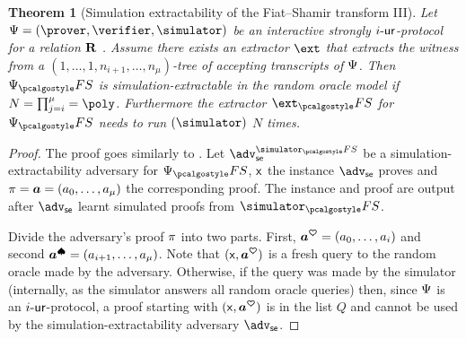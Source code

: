 \documentclass[runningheads]{llncs}
\let\spvec\vec
\let\vec\accentvec
\let\vec\spvec
\def\vec#1{\mathchoice{\mbox{\boldmath$\displaystyle#1$}}
	{\mbox{\boldmath$\textstyle#1$}}
	{\mbox{\boldmath$\scriptstyle#1$}}
	{\mbox{\boldmath$\scriptscriptstyle#1$}}}
\newtheorem{theorem}{Theorem}%
\theoremstyle{definition}
\begin{document}
\begin{theorem}[Simulation extractability of the Fiat--Shamir transform III]
	\label{thm:wit_ext_em_FS_III}
	Let $\proofsystem = (\prover, \verifier, \simulator)$ be an interactive strongly ${i\text{-}\mathsf{ur}}$-protocol for a relation $\mathbf{R}$ . 
	Assume there exists an extractor $\ext$ that extracts the witness from a $(1, \ldots, 1, n_{i + 1}, \ldots, n_\mu)$-tree of accepting transcripts of $\mathrm{\Psi}$. 
	Then $\proofsystem_\fs$ is simulation-extractable in the random oracle model if $N =\prod_{j = i}^\mu = \poly$.
	Furthermore the extractor $\ext_\fs$ for $\proofsystem_\fs$ needs to run $(\simulator)$ $N$ times.
\end{theorem}
\begin{proof}
	The proof goes similarly to \cite[Theorem 3]{INDOCRYPT:FKMV12}.
	Let $\adv_\se^{\simulator_\fs}$ be a simulation-extractability adversary for $\proofsystem_\fs$, $\mathsf{x}$ the instance $\adv_\se$ proves and $\zkproof = \vec{a} = (a_0, \ldots, a_\mu)$ the corresponding proof. 
	The instance and proof are output after $\adv_\se$ learnt simulated proofs from $\simulator_\fs$.
	
	Divide the adversary's proof $\pi$ into two parts. First, $\vec{a^\heartsuit} = (a_0, \ldots, a_i)$ and second $\vec{a^{\spadesuit}} = (a_{i + 1}, \ldots, a_\mu)$.
	Note that $(\inp, \vec{a^\heartsuit})$ is a fresh query to the random oracle made by the adversary. 
	Otherwise, if the query was made  by the simulator (internally, as the simulator answers all random oracle queries) then, since $\mathrm{\Psi}$ is an ${i\text{-}\mathsf{ur}}$-protocol, a proof starting with $(\inp, \vec{a^\heartsuit})$ is in the list $Q$ and cannot be used by the simulation-extractability adversary $\adv_\se$.
\end{proof}
\end{document}
